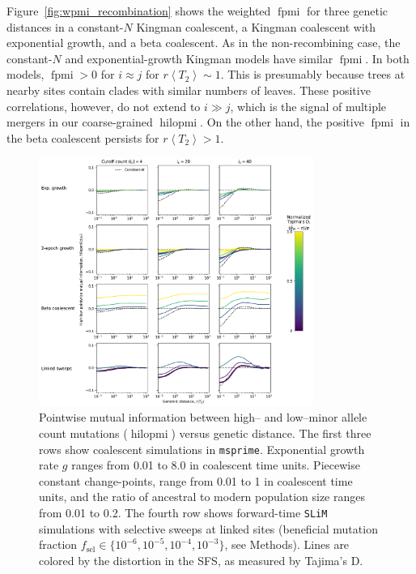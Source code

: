 \documentclass[11pt, letterpaper]{article}   	%
\newcommand{\Fig}[1]{Figure~\ref{#1}}
\newcommand{\E}[1]{\left< #1 \right>}
\DeclareMathOperator{\fpmi}{fpmi}
\DeclareMathOperator{\hilopmi}{hilopmi}
\begin{document}
\Fig{fig:wpmi_recombination} shows the weighted $\fpmi$ for three genetic distances in a constant-$N$ Kingman coalescent, a Kingman coalescent with exponential growth, and a beta coalescent.
As in the non-recombining case, the constant-$N$ and exponential-growth Kingman models have similar $\fpmi$.
In both models, $\fpmi > 0$ for $i\approx j$ for $r\E{T_2} \sim 1$.
This is presumably because trees at nearby sites contain clades with similar numbers of leaves.
These positive correlations, however, do not extend to $i \gg j$, which is the signal of multiple mergers in our coarse-grained $\hilopmi$.
On the other hand, the positive $\fpmi$ in the beta coalescent persists for $r\E{T_2} > 1$.

\begin{figure}
\centering
\includegraphics[width=0.8\textwidth]{figures/figure5.pdf}
\caption{Pointwise mutual information between high-- and low--minor allele count mutations ($\hilopmi$) versus genetic distance. The first three rows show coalescent simulations in \texttt{msprime}. Exponential growth rate $g$ ranges from 0.01 to 8.0 in coalescent time units. Piecewise constant change-points, range from 0.01 to 1 in coalescent time units, and the ratio of ancestral to modern population size ranges from 0.01 to 0.2. The fourth row shows forward-time \texttt{SLiM} simulations with selective sweeps at linked sites (beneficial mutation fraction $f_{\text{sel}} \in \{10^{-6}, 10^{-5}, 10^{-4}, 10^{-3}\}$, see Methods). Lines are colored by the distortion in the SFS, as measured by Tajima's D. \label{fig:hilo_vs_d}}
\end{figure}
\end{document}
